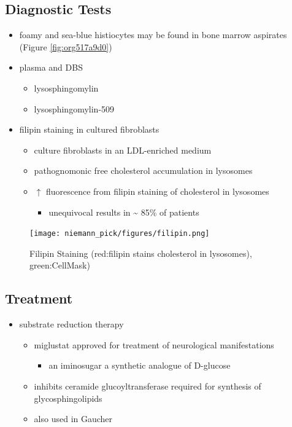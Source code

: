 \documentclass[12pt]{scrartcl}
\begin{document}
\subsection{Diagnostic Tests}
\label{sec:orgc248dfe}
\begin{itemize}
\item foamy and sea-blue histiocytes may be found in bone marrow aspirates
(Figure \ref{fig:org517a9d0})
\item plasma and DBS
\begin{itemize}
\item lysosphingomylin
\item lysosphingomylin-509
\end{itemize}
\item filipin staining in cultured fibroblasts
\begin{itemize}
\item culture fibroblasts in an LDL-enriched medium
\item pathognomonic free cholesterol accumulation in lysosomes
\item \(\uparrow\) fluorescence from filipin staining of cholesterol in lysosomes 
\begin{itemize}
\item unequivocal results in \textasciitilde{} 85\% of patients
\end{itemize}
\end{itemize}
\end{itemize}


\begin{figure}[htbp]
\centering
\texttt{[image: niemann\_pick/figures/filipin.png]}
\caption{\label{fig:org3f77219}Filipin Staining (red:filipin stains cholesterol in lysosomes), green:CellMask)}
\end{figure}

\subsection{Treatment}
\label{sec:org9ed4bac}
\begin{itemize}
\item substrate reduction therapy
\begin{itemize}
\item miglustat approved for treatment of neurological manifestations
\begin{itemize}
\item an iminosugar a synthetic analogue of D-glucose
\end{itemize}
\item inhibits ceramide glucoyltransferase required for synthesis of
glycosphingolipids
\item also used in Gaucher
\end{itemize}
\end{itemize}
\end{document}
